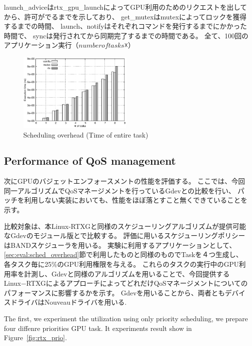 
launch\_adviceはrtx\_gpu\_launchによってGPU利用のためのリクエストを出してから、許可がでるまでを示しており、
get\_mutexはmutexによってロックを獲得するまでの時間、
launch、notifyはそれぞれコマンドを発行するまでにかかった時間で、
syncは発行されてから同期完了するまでの時間である。
全て、100回のアプリケーション実行（$number of tasks ☓$）

\begin{figure}[t]
\begin{center}
\includegraphics[width=0.5\textwidth]{img/sum_task.eps}
\caption{Scheduling overhead (Time of entire task)}
\end{center}
\label{fig:fp_overhead}
\end{figure}


\subsection{Performance of QoS management}

次にGPUのバジェットエンフォースメントの性能を評価する。
ここでは、今回同一アルゴリズムでQoSマネージメントを行っているGdevとの比較を行い、
パッチを利用しない実装においても、性能をほぼ落とすこと無くできていることを示す。

比較対象は、本Linux-RTXGと同様のスケジューリングアルゴリズムが提供可能なGdevのモジュール版とで比較する。
評価に用いるスケジューリングポリシーはBANDスケジューラを用いる。
実験に利用するアプリケーションとして、\ref{sec:eval:sched_overhead}節で利用したものと同様のものでTaskを４つ生成し、各タスク毎に25\%のGPU利用権限を与える。
これらのタスクの実行中のGPU利用率を計測し、Gdevと同様のアルゴリズムを用いることで、今回提供するLinux−RTXGによるアプローチによってどれだけQoSマネージメントについてのパフォーマンスに影響するかを示す。
Gdevを用いることから、両者ともデバイスドライバはNouveauドライバを用いる.

The first, we experiment the utilization using only priority scheduling, we prepare four diffenre priorities GPU task.
It experiments result show in Figure~\ref{fig:rtx_prio}.

